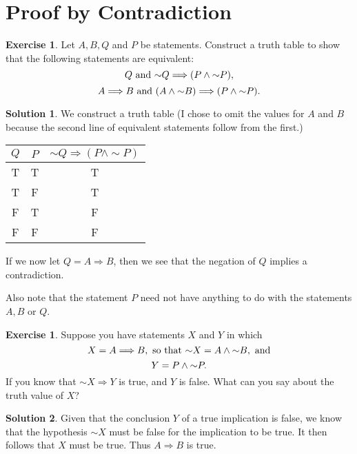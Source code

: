 \documentclass[a4paper, 11pt]{report}
\theoremstyle{plain}
\theoremstyle{definition}
\newtheorem{exrc}[thm]{Exercise}
\newtheorem*{sltn}{Solution}
\newcommand{\impl}{\Longrightarrow}
\renewcommand{\neg}{{\sim}} %
\begin{document}
\section{Proof by Contradiction}
\label{sec:proof_by_contradiction}

\begin{exrc}
  Let $A, B, Q$ and $P$ be statements. Construct a truth table to show that the
  following statements are equivalent:
  \begin{equation}
    \notag
    Q \text{ and } \neg Q \impl (P \land \neg P), 
  \end{equation}
  \begin{equation}
    \notag
    A \impl B \text{ and } (A \land \neg B) \impl (P \land \neg P).
  \end{equation}
\end{exrc}
\begin{sltn}
  We construct a truth table (I chose to omit the values for $A$ and $B$
  because the second line of equivalent statements follow from the first.)
  \begin{center} 
  \begin{tabular}{ccc}
    \hline
    $Q$& $P$& $\neg Q \impl (P \land \neg P)$\\
    \hline
    T&  T& T\\
    T&  F& T\\
    F&  T& F\\
    F&  F& F\\
    \hline
  \end{tabular}
\end{center}
If we now let $Q = A \impl B$, then we see that the negation of $Q$ implies a
contradiction.
\end{sltn}
Also note that the statement $P$ need not have anything to do with the
statements $A, B$ or $Q$.

\begin{exrc}
  Suppose you have statements $X$ and $Y$ in which
  \begin{equation}
    \notag
    X = A \impl B, \text{ so that } \neg X = A \land \neg B, \text{ and}
  \end{equation}
  \begin{equation}
    \notag
    Y = P \land \neg P.
  \end{equation}
  If you know that $\neg X \impl Y$ is true, and $Y$ is false. What can you say
  about the truth value of $X$?
\end{exrc}
\begin{sltn}
  Given that the conclusion $Y$ of a true implication is false, we know that
  the hypothesis $\neg X$ must be false for the implication to be true. It then
  follows that $X$ must be true.  Thus $A \impl B$ is true.
\end{sltn}
\end{document}
